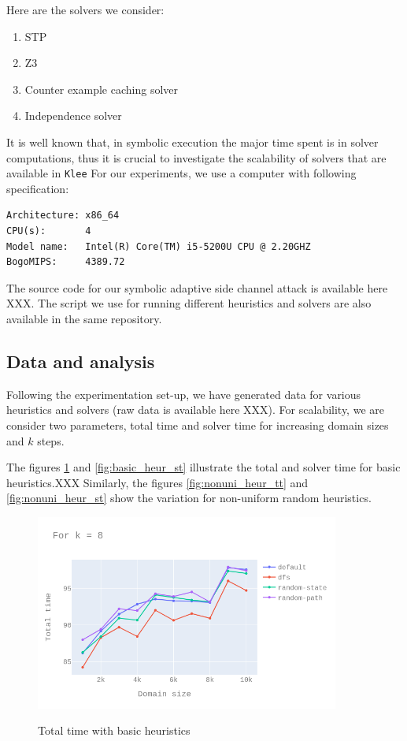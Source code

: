 \documentclass[11pt,a4paper,notitlepage]{article}
\begin{document}
Here are the solvers we consider:
\begin{enumerate}
\item STP
\item Z3
\item Counter example  caching solver
\item Independence solver
\end{enumerate}

It is well known that, in symbolic execution the major time spent is in solver computations, thus it is crucial to investigate the scalability of solvers that are available in \texttt{Klee}
For our experiments, we use a computer with following specification:
\begin{verbatim}
Architecture: x86_64
CPU(s):       4
Model name:   Intel(R) Core(TM) i5-5200U CPU @ 2.20GHZ
BogoMIPS:     4389.72
\end{verbatim}

The source code for our symbolic adaptive side channel attack is available here XXX.
The script we use for running different heuristics and solvers are also available in the same repository.

\subsection{Data and analysis}
\label{subsec:dataandanalysis}

Following the experimentation set-up, we have generated data for various heuristics and solvers (raw data is available here XXX).
For scalability, we are consider two parameters, total time and solver time for increasing domain sizes and $k$ steps.

The figures \ref{fig:basic_heur_tt} and \ref{fig:basic_heur_st} illustrate the total and solver time for basic heuristics.XXX
Similarly, the figures \ref{fig:nonuni_heur_tt} and \ref{fig:nonuni_heur_st} show the variation for non-uniform random heuristics.

\begin{figure}[h]
\centering
\includegraphics[width=10cm]{k_8_tt_basic_heur.png}
\label{fig:basic_heur_tt}
\caption{Total time with basic heuristics}
\centering
\end{figure}
\end{document}
